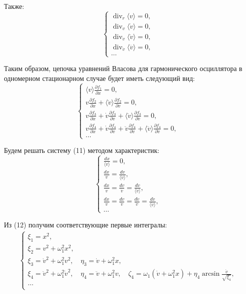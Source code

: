 \documentclass[a4paper,14pt]{article}
\begin{document}
Также:
\begin{equation}
\begin{cases}
\operatorname{div}_{r}\langle v\rangle= 0,\\
\operatorname{div}_{v}\langle\dot{v}\rangle= 0, \\
\operatorname{div}_{\dot{v}}\langle\ddot{v}\rangle= 0, \\
\operatorname{div}_{\ddot{v}}\langle\dddot{v}\rangle= 0, \\
\ldots \
\end{cases}
\end{equation}

Таким образом, цепочка уравнений Власова для гармонического осциллятора в одномерном стационарном случае будет иметь следующий вид:
\begin{equation}
\begin{cases}
{\langle v\rangle \frac{\partial f_{1}}{\partial x}=0}, \\ 
{v \frac{\partial f_{2}}{\partial x}+\langle\dot{v}\rangle \frac{\partial f_{2}}{\partial v}=0}, \\
v \frac{\partial f_{3}}{\partial x}+\dot{v} \frac{\partial f_{3}}{\partial v}+\langle\ddot{v}\rangle \frac{\partial f_{3}}{\partial \dot{v}}=0, \\
v \frac{\partial f_{4}}{\partial x}+\dot{v} \frac{\partial f_{4}}{\partial v}+\ddot{v} \frac{\partial f_{4}}{\partial \dot{v}}+\langle\dddot{v}\rangle \frac{\partial f_{4}}{\partial \ddot{v}}=0, \\
\ldots
\end{cases}
\end{equation}

Будем решать систему (11) методом характеристик:
\begin{equation}
\begin{cases}
{\frac{d x}{\langle v\rangle}=0}, \\ 
{\frac{d x}{v}=\frac{d v}{\langle\dot{v}\rangle}}, \\
\frac{d x}{v}=\frac{d v}{\dot{v}}=\frac{d \dot{v}}{\langle\ddot{v}\rangle}, \\
\frac{d x}{v}=\frac{d v}{\dot{v}}=\frac{d \dot{v}}{\ddot{v}}=\frac{d \ddot{v}}{\langle \dddot{v}\rangle}, \\
\ldots
\end{cases}
\end{equation}

Из (12) получим соответствующие первые интегралы:
\begin{eqnarray}
\begin{cases}
{\xi_{1}=x^{2}}, \\ 
{\xi_{2}=v^{2}+\omega_{1}^{2} x^{2}}, \\
{\xi_{3}=\dot{v}^{2}+\omega_{1}^{2} v^{2}, \quad \eta_{3}=\dot{v}+\omega_{1}^{2} x}, \\ 
{\xi_{4}=\ddot{v}^{2}+\omega_{1}^{2} \dot{v}^{2},\quad \eta_{4}=\ddot{v}+\omega_{1}^{2} v,\quad \zeta_{4}=\omega_{1}\left(\dot{v}+\omega_{1}^{2} x\right)+\eta_{4} \arcsin \frac{\ddot{v}}{\sqrt{\xi_{4}}}},\\
\ldots \\
\end{cases}
\end{eqnarray}
\end{document}

